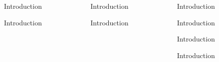 \documentclass[20pt]{beamer}
\begin{document}

\begin{frame}[t]

\begin{columns}[t]

\begin{column}{0.32\linewidth}

\begin{block}{Introduction}


\end{block}


\begin{block}{Introduction}

\end{block}


\end{column}
\begin{column}{0.32\linewidth}

\begin{block}{Introduction}

\end{block}

\begin{block}{Introduction}

\end{block}


\end{column}
\begin{column}{0.32\linewidth}

\begin{block}{Introduction}

\end{block}

\begin{block}{Introduction}

\end{block}

\begin{block}{Introduction}

\end{block}

\begin{block}{Introduction}

\end{block}


\end{column}
\end{columns}







\end{frame}
\end{document}
